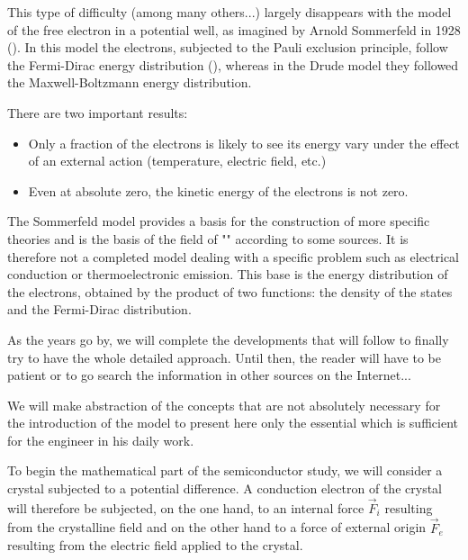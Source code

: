 	This type of difficulty (among many others...) largely disappears with the model of the free electron in a potential well, as imagined by Arnold Sommerfeld in 1928 (). In this model the electrons, subjected to the Pauli exclusion principle, follow the Fermi-Dirac energy distribution (), whereas in the Drude model they followed the Maxwell-Boltzmann energy distribution.

	There are two important results:
	\begin{itemize}
		\item Only a fraction of the electrons is likely to see its energy vary under the effect of an external action (temperature, electric field, etc.)

		\item Even at absolute zero, the kinetic energy of the electrons is not zero.
	\end{itemize}
	The Sommerfeld model provides a basis for the construction of more specific theories and is the basis of the field of "" according to some sources. It is therefore not a completed model dealing with a specific problem such as electrical conduction or thermoelectronic emission. This base is the energy distribution of the electrons, obtained by the product of two functions: the density of the states and the Fermi-Dirac distribution.
	
	As the years go by, we will complete the developments that will follow to finally try to have the whole detailed approach. Until then, the reader will have to be patient or to go search the information in other sources on the Internet...

	We will make abstraction of the concepts that are not absolutely necessary for the introduction of the model to present here only the essential which is sufficient for the engineer in his daily work.

	To begin the mathematical part of the semiconductor study, we will consider a crystal subjected to a potential difference. A conduction electron of the crystal will therefore be subjected, on the one hand, to an internal force $\vec{F}_i$ resulting from the crystalline field and on the other hand to a force of external origin $\vec{F}_e$ resulting from the electric field applied to the crystal.
	
